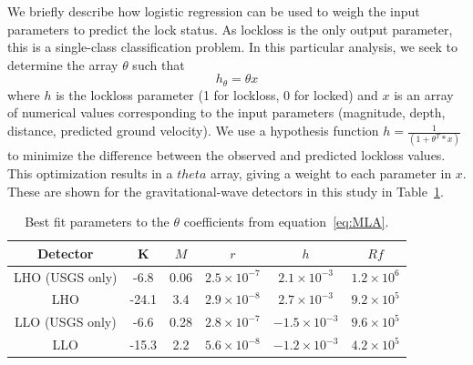 \documentclass[reprint, prl, aps, showpacs]{revtex4-1}
\begin{document}
We briefly describe how logistic regression can be used to weigh the input parameters to predict the lock status. As lockloss is the only output parameter, this is a single-class classification problem. In this particular analysis, we seek to determine the array $\theta$ such that \begin{equation}
h_{\theta} = \theta x
\label{eq:MLA}
\end{equation}
where $h$ is the lockloss parameter (1 for lockloss, 0 for locked) and $x$ is an array of numerical values corresponding to the input parameters (magnitude, depth, distance, predicted ground velocity). We use a hypothesis function $h= \frac{1}{(1+{\theta^{T}*x})}$ to minimize the difference between the observed and predicted lockloss values. This optimization results in a $theta$ array, giving a weight to each parameter in $x$.
These are shown for the gravitational-wave detectors in this study in Table~\ref{table:MLAfit}. 

\begin{table}[]
\centering
\label{table:MLAfit}
\begin{tabular}{|c|c|c|c|c|c|}
\hline
Detector & K & $M$ & $r$ & $h$ & $Rf$  \\ \hline
LHO (USGS only) & -6.8 & 0.06 & $2.5 \times 10^{-7}$ & $2.1 \times 10^{-3}$ & $1.2 \times 10^{6}$ \\ \hline
LHO & -24.1 & 3.4 & $2.9 \times 10^{-8}$ & $2.7 \times 10^{-3}$ & $9.2 \times 10^{5}$ \\ \hline
LLO (USGS only) & -6.6 & 0.28 & $2.8 \times 10^{-7}$ & $-1.5 \times 10^{-3}$ & $9.6 \times 10^{5}$ \\ \hline
LLO & -15.3 & 2.2 & $5.6 \times 10^{-8}$ & $-1.2 \times 10^{-3}$ & $4.2 \times 10^{5}$\\ \hline
\end{tabular}
\caption{Best fit parameters to the $\theta$ coefficients from equation~\ref{eq:MLA}.}
\end{table}
	
\end{document}
